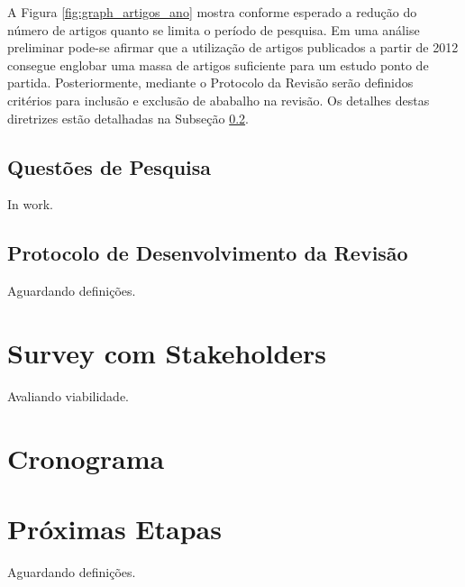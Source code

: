 \documentclass{article}
\begin{document}
A Figura \ref{fig:graph_artigos_ano} mostra conforme esperado a
redução do número de artigos quanto se limita o período de
pesquisa. Em uma análise preliminar pode-se afirmar que a utilização
de artigos publicados a partir de 2012 consegue englobar uma massa de
artigos suficiente para um estudo ponto de partida. Posteriormente,
mediante o Protocolo da Revisão serão definidos critérios para
inclusão e exclusão de ababalho na revisão. Os detalhes destas
diretrizes estão detalhadas na Subseção \ref{subsec:protocol}.

\subsection{Questões de Pesquisa}
\label{subsec:research_question}

In work.

\subsection{Protocolo de Desenvolvimento da Revisão}
\label{subsec:protocol}

Aguardando definições.

\section{Survey com Stakeholders}
\label{sec:survey}

Avaliando viabilidade.

\section{Cronograma}
\label{sec:cronograma}


\section{Próximas Etapas}
\label{sec:proximas_etapas}

Aguardando definições.

\medskip


\end{document}
